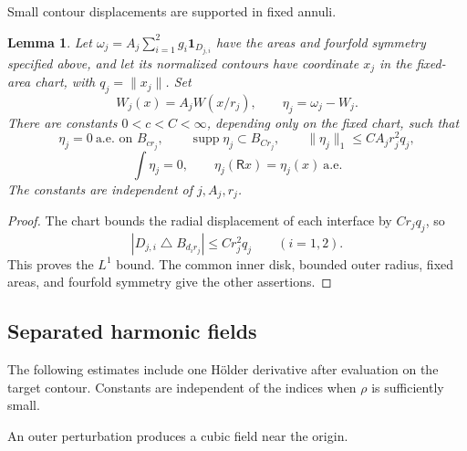 \documentclass[11pt]{amsart}
\newtheorem{lemma}[theorem]{Lemma}
\theoremstyle{remark}
\numberwithin{equation}{section}
\begin{document}
Small contour displacements are supported in fixed annuli.

\begin{lemma}
\label{ib:annular-perturbation}
Let $\omega_j=A_j\sum_{i=1}^2g_i\mathbf1_{D_{j,i}}$ have the
areas and fourfold symmetry specified above, and let its normalized
contours have coordinate $x_j$ in the fixed-area chart, with
$q_j=\|x_j\|$. Set
\[
 W_j(x)=A_jW(x/r_j),\qquad \eta_j=\omega_j-W_j.
\]
There are constants $0<c<C<\infty$, depending only on the fixed
chart, such that
\[
 \eta_j=0\ \text{a.e. on }B_{cr_j},\qquad
 \operatorname{supp}\eta_j\subset B_{Cr_j},\qquad
 \|\eta_j\|_1\le CA_jr_j^2q_j,
\]
\[
 \int\eta_j=0,\qquad \eta_j(\mathsf Rx)=\eta_j(x)\ \text{a.e.}
\]
The constants are independent of $j,A_j,r_j$.
\end{lemma}
\begin{proof}
The chart bounds the radial displacement of each interface by
$Cr_jq_j$, so
\[
 |D_{j,i}\mathbin{\triangle}B_{d_ir_j}|\le Cr_j^2q_j
 \qquad(i=1,2).
\]
This proves the $L^1$ bound. The common inner disk, bounded outer
radius, fixed areas, and fourfold symmetry give the other assertions.
\end{proof}

\subsection{Separated harmonic fields}
The following estimates include one H\"older derivative after evaluation on the target contour. Constants are independent of the indices when $\rho$ is sufficiently small.

An outer perturbation produces a cubic field near the origin.
\end{document}
